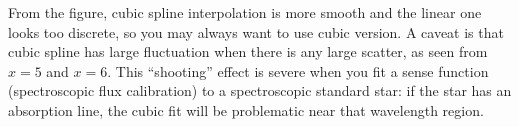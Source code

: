 From the figure, cubic spline interpolation is more smooth and the linear one looks too discrete, so you may always want to use cubic version. A caveat is that cubic spline has large fluctuation when there is any large scatter, as seen from $ x = 5 $ and $ x = 6 $. This ``shooting'' effect is severe when you fit a sense function (spectroscopic flux calibration) to a spectroscopic standard star: if the star has an absorption line, the cubic fit will be problematic near that wavelength region. 
